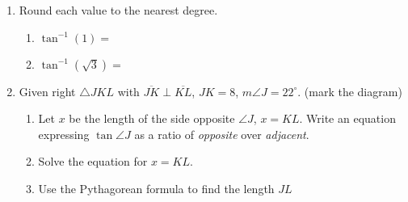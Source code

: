 \documentclass[12pt, twoside]{article}
\begin{document}
\begin{enumerate}
  \item Round each value to the nearest degree.  \vspace{.5cm}
  \begin{multicols}{2}
    \begin{enumerate}
      \item $\tan^{-1} (1) = $ \vspace{1cm}
      \item $\tan^{-1} (\sqrt{3}) =$
    \end{enumerate}
  \end{multicols} \vspace{1cm}

\item Given right $\triangle JKL$ with $\overline{JK} \perp \overline{KL}$, $JK=8$, $m\angle J=22^\circ$. (mark the diagram)
    \begin{enumerate}
      \item Let $x$ be the length of the side opposite $\angle J$, $x=KL$. Write an equation expressing $\tan \angle J$ as a ratio of \emph{opposite} over \emph{adjacent}.  
    \begin{flushright}
      \end{flushright}
      \item Solve the equation for $x=KL$. \vspace{3cm}
      \item Use the Pythagorean formula to find the length $JL$
    \end{enumerate}

\end{enumerate}
\end{document}
